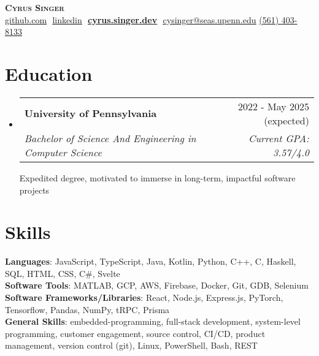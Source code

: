 \documentclass[letterpaper,11pt]{article}
\makeatletter
\newcommand{\resumeSubheading}[4]{
  \vspace{-2pt}\item
    \begin{tabular*}{0.97\textwidth}[t]{l@{\extracolsep{\fill}}r}
      \textbf{#1} & #2 \\
      \textit{\small#3} & \textit{\small #4} \\
    \end{tabular*}\vspace{-7pt}
}
\newcommand{\resumeSubHeadingListStart}{\begin{itemize}[leftmargin=0.15in, label={}]}
\newcommand{\resumeSubHeadingListEnd}{\end{itemize}}
\makeatother
\begin{document}
\hfill

\begin{center}
    \textbf{\Huge \scshape Cyrus Singer} \\ \vspace{8pt}
    \small 
    \href{https://github.com/brianbob12}{\underline{github.com}} $  $
    \href{https://www.linkedin.com/in/cyrus-singer}{\underline{linkedin}} $  $
    \href{https://cyrus.singer.dev}{\textbf{\underline{cyrus.singer.dev}}} $ $
    \href{mailto:cysinger@seas.upenn.edu}
    {\underline{cysinger@seas.upenn.edu}}
    \href{tel:561-403-8133}{\underline{(561) 403-8133}}
\end{center}

\section{ Education}
  \resumeSubHeadingListStart
  
    \resumeSubheading
      {University of Pennsylvania}{2022 - May 2025 (expected)}
      {Bachelor of Science And Engineering in Computer Science}{Current GPA: 3.57/4.0}

      \vspace{2pt}

      \scriptsize{Expedited degree, motivated to immerse in long-term, impactful software projects}

      
      
  \resumeSubHeadingListEnd

  \section{ Skills}
  \begin{itemize}[leftmargin=0.15in, label={}]
      \small{\item{
      
      \textbf{Languages}{: JavaScript, TypeScript, Java, Kotlin, Python, C++, C, Haskell, SQL, HTML, CSS, C\#, Svelte} \\
      
      \textbf{Software Tools}{: MATLAB, GCP, AWS, Firebase, Docker, Git, GDB, Selenium}\\

      \textbf{Software Frameworks/Libraries}{: React, Node.js, Express.js, PyTorch, Tensorflow, Pandas, NumPy, tRPC, Prisma} \\

      \textbf{General Skills}{: embedded-programming, full-stack development, system-level programming, customer engagement,
      source control, CI/CD, product management, version control (git), Linux, PowerShell, Bash, REST}
      }}
  \end{itemize}
\end{document}
